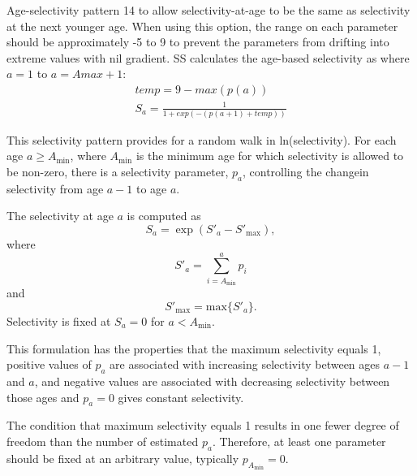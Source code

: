 Age-selectivity pattern 14 to allow selectivity-at-age to be the same as selectivity at the next younger age.  When using this option, the range on each parameter should be approximately -5 to 9 to prevent the parameters from drifting into extreme values with nil gradient. SS calculates the age-based selectivity as where $a = 1$ to $a = Amax + 1$:
	\begin{equation}
		 \begin{split}
		 temp = 9 - max(p(a))\\
		S_a = \frac{1}{1+exp(-(p(a+1) + temp))}
		\end{split}
	\end{equation}	

This selectivity pattern provides for a random walk in ln(selectivity).  For each age $a \geq A_{\text{min}}$, where $A_{\text{min}}$ is the minimum age for which selectivity is allowed to be non-zero, there is a selectivity parameter, $p_a$, controlling the changein selectivity from age $a-1$ to age $a$.
	
The selectivity at age $a$ is computed as
	\begin{equation}
	S_a = \exp (S'_a - S'_{\text{max}}),
	\end{equation}
where
	\begin{equation}
	S'_a = \sum_{i = A_{\text{min}}}^a p_i
	\end{equation}
and 
	\begin{equation}
	S'_{\text{max}} = \mbox{max} \{S'_a\}.
	\end{equation}
Selectivity is fixed at $S_a = 0$ for $a < A_{\text{min}}$. 
	
This formulation has the properties that the maximum selectivity equals 1, positive values of $p_a$ are associated with increasing selectivity between ages $a-1$ and $a$, and negative values are associated with decreasing selectivity between those ages and $p_a = 0$ gives constant selectivity.
	
The condition that maximum selectivity equals 1 results in one fewer degree of freedom than the number of estimated $p_a$. Therefore, at least one parameter should be fixed at an arbitrary value, typically $p_{A_{\text{min}}}=0$.
	
